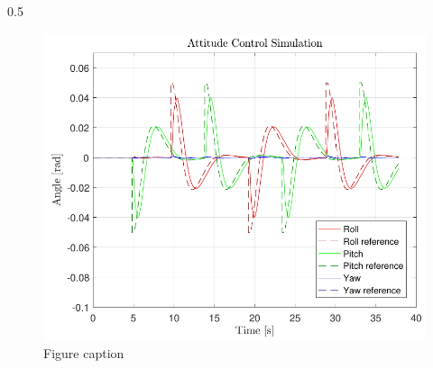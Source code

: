 \vspace{-2cm}
\begin{columns}[t,totalwidth=\twocolwid] %
		
		\begin{column}{0.5\twocolwid}%
  		\centering
			\begin{figure}
				\includegraphics[width=.9\linewidth]{figures/AttitudeControl}
				\caption{Figure caption}
			\end{figure}
		\end{column} %
		

\end{columns}
